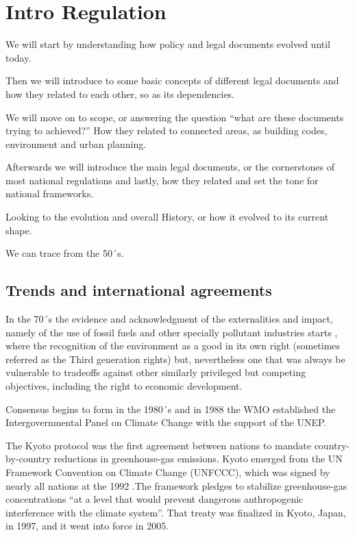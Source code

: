 \documentclass[]{book}
\theoremstyle{definition}
\theoremstyle{definition}
\theoremstyle{definition}
\theoremstyle{remark}
\begin{document}
\section{Intro Regulation}\label{intro-regulation}

We will start by understanding how policy and legal documents evolved
until today.

Then we will introduce to some basic concepts of different legal
documents and how they related to each other, so as its dependencies.

We will move on to scope, or answering the question ``what are these
documents trying to achieved?'' How they related to connected areas, as
building codes, environment and urban planning.

Afterwards we will introduce the main legal documents, or the
cornerstones of most national regulations and lastly, how they related
and set the tone for national frameworks.

Looking to the evolution and overall History, or how it evolved to its
current shape.

We can trace from the 50´s.

\subsection{Trends and international
agreements}\label{trends-and-international-agreements}

In the 70´s the evidence and acknowledgment of the externalities and
impact, namely of the use of fossil fuels and other specially pollutant
industries starts , where the recognition of the environment as a good
in its own right (sometimes referred as the Third generation rights)
but, nevertheless one that was always be vulnerable to tradeoffs against
other similarly privileged but competing objectives, including the right
to economic development.

Consensus begins to form in the 1980´s and in 1988 the WMO established
the Intergovernmental Panel on Climate Change with the support of the
UNEP.

The Kyoto protocol was the first agreement between nations to mandate
country-by-country reductions in greenhouse-gas emissions. Kyoto emerged
from the UN Framework Convention on Climate Change (UNFCCC), which was
signed by nearly all nations at the 1992 .The framework pledges to
stabilize greenhouse-gas concentrations ``at a level that would prevent
dangerous anthropogenic interference with the climate system''. That
treaty was finalized in Kyoto, Japan, in 1997, and it went into force in
2005.
\end{document}
